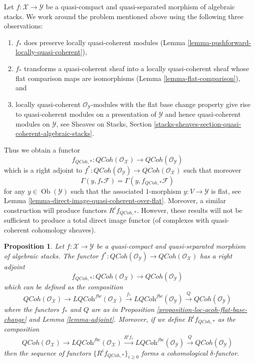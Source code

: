 \documentclass{stacks-project}
\theoremstyle{plain}
\newtheorem{proposition}[subsection]{Proposition}
\theoremstyle{definition}
\theoremstyle{remark}
\numberwithin{equation}{subsection}
\def\Ob{\mathop{\mathrm{Ob}}\nolimits}
\def\QCoh{\mathit{QCoh}}
\begin{document}
\medskip\noindent
Let $f : \mathcal{X} \to \mathcal{Y}$ be a quasi-compact and
quasi-separated morphism of algebraic stacks. We work around the problem
mentioned above using the following three observations:
\begin{enumerate}
\item $f_*$ does preserve locally quasi-coherent
modules (Lemma \ref{lemma-pushforward-locally-quasi-coherent}),
\item $f_*$ transforms a quasi-coherent sheaf into a locally quasi-coherent
sheaf whose flat comparison maps are isomorphisms
(Lemma \ref{lemma-flat-comparison}), and
\item locally quasi-coherent $\mathcal{O}_\mathcal{Y}$-modules
with the flat base change property give rise to quasi-coherent
modules on a presentation of $\mathcal{Y}$ and hence quasi-coherent
modules on $\mathcal{Y}$, see
Sheaves on Stacks, Section
\ref{stacks-sheaves-section-quasi-coherent-algebraic-stacks}.
\end{enumerate}
Thus we obtain a functor
$$
f_{\QCoh, *} :
\QCoh(\mathcal{O}_\mathcal{X})
\longrightarrow
\QCoh(\mathcal{O}_\mathcal{Y})
$$
which is a right adjoint to
$f^* : \QCoh(\mathcal{O}_\mathcal{Y}) \to
\QCoh(\mathcal{O}_\mathcal{X})$
such that moreover
$$
\Gamma(y, f_*\mathcal{F}) = \Gamma(y, f_{\QCoh, *}\mathcal{F})
$$
for any $y \in \Ob(\mathcal{Y})$ such that the associated
$1$-morphism $y : V \to \mathcal{Y}$ is flat, see
Lemma \ref{lemma-direct-image-quasi-coherent-over-flat}.
Moreover, a similar construction will produce functors
$R^if_{\QCoh, *}$.
However, these results will not be sufficient to produce a
total direct image functor (of complexes with quasi-coherent
cohomology sheaves).

\begin{proposition}
\label{proposition-direct-image-quasi-coherent}
Let $f : \mathcal{X} \to \mathcal{Y}$ be a quasi-compact and quasi-separated
morphism of algebraic stacks. The functor
$f^* : \QCoh(\mathcal{O}_\mathcal{Y}) \to
\QCoh(\mathcal{O}_\mathcal{X})$
has a right adjoint
$$
f_{\QCoh, *} :
\QCoh(\mathcal{O}_\mathcal{X})
\longrightarrow
\QCoh(\mathcal{O}_\mathcal{Y})
$$
which can be defined as the composition
$$
\QCoh(\mathcal{O}_\mathcal{X}) \to
\textit{LQCoh}^{fbc}(\mathcal{O}_\mathcal{X})
\xrightarrow{f_*} \textit{LQCoh}^{fbc}(\mathcal{O}_\mathcal{Y})
\xrightarrow{Q} \QCoh(\mathcal{O}_\mathcal{Y})
$$
where the functors $f_*$ and $Q$ are as in
Proposition \ref{proposition-loc-qcoh-flat-base-change}
and
Lemma \ref{lemma-adjoint}.
Moreover, if we define $R^if_{\QCoh, *}$ as the composition
$$
\QCoh(\mathcal{O}_\mathcal{X}) \to
\textit{LQCoh}^{fbc}(\mathcal{O}_\mathcal{X})
\xrightarrow{R^if_*} \textit{LQCoh}^{fbc}(\mathcal{O}_\mathcal{Y})
\xrightarrow{Q} \QCoh(\mathcal{O}_\mathcal{Y})
$$
then the sequence of functors $\{R^if_{\QCoh, *}\}_{i \geq 0}$
forms a cohomological $\delta$-functor.
\end{proposition}
\end{document}
